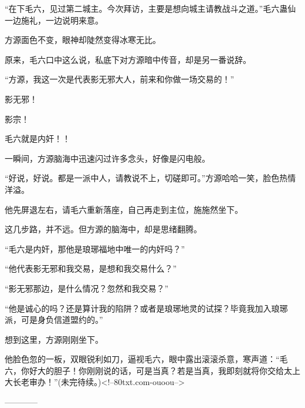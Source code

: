 \begin{this_body}
“在下毛六，见过第二城主。今次拜访，主要是想向城主请教战斗之道。”毛六蛊仙一边施礼，一边说明来意。

方源面色不变，眼神却陡然变得冰寒无比。

原来，毛六口中这么说，私底下对方源暗中传音，却是另一番说辞。

“方源，我这一次是代表影无邪大人，前来和你做一场交易的！”

影无邪！

影宗！

毛六就是内奸！！

一瞬间，方源脑海中迅速闪过许多念头，好像是闪电般。

“好说，好说。都是一派中人，请教说不上，切磋即可。”方源哈哈一笑，脸色热情洋溢。

他先屏退左右，请毛六重新落座，自己再走到主位，施施然坐下。

这几步路，并不远。但方源的脑海中，却是思绪翻腾。

“毛六是内奸，那他是琅琊福地中唯一的内奸吗？”

“他代表影无邪和我交易，是想和我交易什么？”

“影无邪那边，是什么情况？忽然和我交易？”

“他是诚心的吗？还是算计我的陷阱？或者是琅琊地灵的试探？毕竟我加入琅琊派，可是身负信道盟约的。”

想到这里，方源刚刚坐下。

他脸色忽的一板，双眼锐利如刀，逼视毛六，眼中露出滚滚杀意，寒声道：“毛六，你好大的胆子！你刚刚说的话，可是当真？若是当真，我即刻就将你交给太上大长老审办！”(未完待续。)<!--80txt.com-ouoou-->

------------

\end{this_body}

